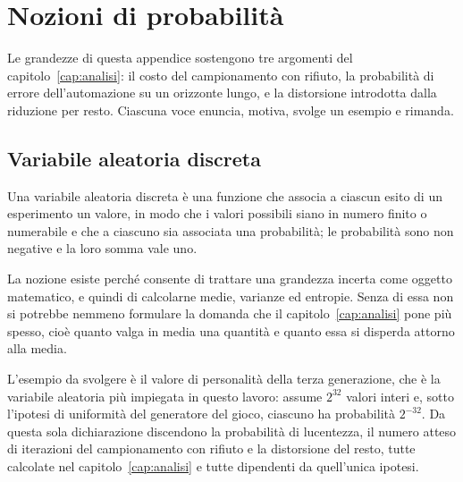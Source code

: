 
\chapter{Nozioni di probabilità}
\label{app:probabilita}

Le grandezze di questa appendice sostengono tre argomenti del capitolo~\ref{cap:analisi}: il costo del campionamento con rifiuto, la probabilità di errore dell'automazione su un orizzonte lungo, e la distorsione introdotta dalla riduzione per resto. Ciascuna voce enuncia, motiva, svolge un esempio e rimanda.

\section{Variabile aleatoria discreta}

Una variabile aleatoria discreta è una funzione che associa a ciascun esito di un esperimento un valore, in modo che i valori possibili siano in numero finito o numerabile e che a ciascuno sia associata una probabilità; le probabilità sono non negative e la loro somma vale uno.

La nozione esiste perché consente di trattare una grandezza incerta come oggetto matematico, e quindi di calcolarne medie, varianze ed entropie. Senza di essa non si potrebbe nemmeno formulare la domanda che il capitolo~\ref{cap:analisi} pone più spesso, cioè quanto valga in media una quantità e quanto essa si disperda attorno alla media.

L'esempio da svolgere è il valore di personalità della terza generazione, che è la variabile aleatoria più impiegata in questo lavoro: assume $2^{32}$ valori interi e, sotto l'ipotesi di uniformità del generatore del gioco, ciascuno ha probabilità $2^{-32}$. Da questa sola dichiarazione discendono la probabilità di lucentezza, il numero atteso di iterazioni del campionamento con rifiuto e la distorsione del resto, tutte calcolate nel capitolo~\ref{cap:analisi} e tutte dipendenti da quell'unica ipotesi.

